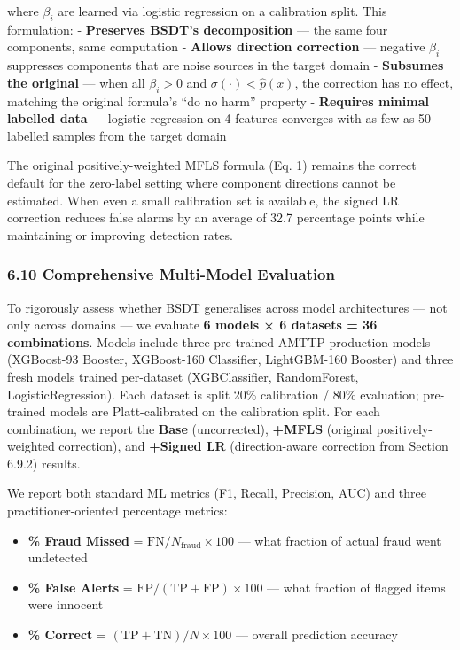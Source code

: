 \documentclass[
  11pt,
]{article}
\providecommand{\tightlist}{%
  \setlength{\itemsep}{0pt}\setlength{\parskip}{0pt}}
\begin{document}
where \(\beta_i\) are learned via logistic regression on a calibration
split. This formulation: - \textbf{Preserves BSDT’s decomposition} — the
same four components, same computation - \textbf{Allows direction
correction} — negative \(\beta_i\) suppresses components that are noise
sources in the target domain - \textbf{Subsumes the original} — when all
\(\beta_i > 0\) and \(\sigma(\cdot) < \hat{p}(x)\), the correction has
no effect, matching the original formula’s “do no harm” property -
\textbf{Requires minimal labelled data} — logistic regression on 4
features converges with as few as 50 labelled samples from the target
domain

The original positively-weighted MFLS formula (Eq. 1) remains the
correct default for the zero-label setting where component directions
cannot be estimated. When even a small calibration set is available, the
signed LR correction reduces false alarms by an average of 32.7
percentage points while maintaining or improving detection rates.

\subsubsection{6.10 Comprehensive Multi-Model
Evaluation}\label{comprehensive-multi-model-evaluation}

To rigorously assess whether BSDT generalises across model architectures
— not only across domains — we evaluate \textbf{6 models × 6 datasets =
36 combinations}. Models include three pre-trained AMTTP production
models (XGBoost-93 Booster, XGBoost-160 Classifier, LightGBM-160
Booster) and three fresh models trained per-dataset (XGBClassifier,
RandomForest, LogisticRegression). Each dataset is split 20\%
calibration / 80\% evaluation; pre-trained models are Platt-calibrated
on the calibration split. For each combination, we report the
\textbf{Base} (uncorrected), \textbf{+MFLS} (original
positively-weighted correction), and \textbf{+Signed LR}
(direction-aware correction from Section 6.9.2) results.

We report both standard ML metrics (F1, Recall, Precision, AUC) and
three practitioner-oriented percentage metrics:

\begin{itemize}
\tightlist
\item
  \textbf{\% Fraud Missed} = \(\text{FN} / N_{\text{fraud}} \times 100\)
  — what fraction of actual fraud went undetected
\item
  \textbf{\% False Alerts} =
  \(\text{FP} / (\text{TP} + \text{FP}) \times 100\) — what fraction of
  flagged items were innocent
\item
  \textbf{\% Correct} = \((\text{TP} + \text{TN}) / N \times 100\) —
  overall prediction accuracy
\end{itemize}
\end{document}
